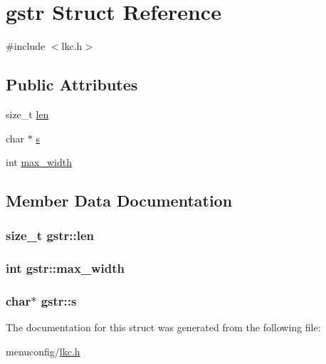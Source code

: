 \hypertarget{structgstr}{\section{gstr Struct Reference}
\label{structgstr}
}


{\ttfamily \#include $<$lkc.\-h$>$}

\subsection*{Public Attributes}
\begin{DoxyCompactItemize}
\item 
size\-\_\-t \hyperlink{structgstr_a0aa405b6a28c2002ca71753ae7964145}{len}
\item 
char $\ast$ \hyperlink{structgstr_a58fd8e782debafea84cbb2f02bab1bf6}{s}
\item 
int \hyperlink{structgstr_a6d8958bd7374668e693e88dc999389d4}{max\-\_\-width}
\end{DoxyCompactItemize}


\subsection{Member Data Documentation}
\hypertarget{structgstr_a0aa405b6a28c2002ca71753ae7964145}{
\subsubsection[{len}]{\setlength{\rightskip}{0pt plus 5cm}size\-\_\-t gstr\-::len}}\label{structgstr_a0aa405b6a28c2002ca71753ae7964145}
\hypertarget{structgstr_a6d8958bd7374668e693e88dc999389d4}{
\subsubsection[{max\-\_\-width}]{\setlength{\rightskip}{0pt plus 5cm}int gstr\-::max\-\_\-width}}\label{structgstr_a6d8958bd7374668e693e88dc999389d4}
\hypertarget{structgstr_a58fd8e782debafea84cbb2f02bab1bf6}{
\subsubsection[{s}]{\setlength{\rightskip}{0pt plus 5cm}char$\ast$ gstr\-::s}}\label{structgstr_a58fd8e782debafea84cbb2f02bab1bf6}


The documentation for this struct was generated from the following file\-:\begin{DoxyCompactItemize}
\item 
menuconfig/\hyperlink{lkc_8h}{lkc.\-h}\end{DoxyCompactItemize}
